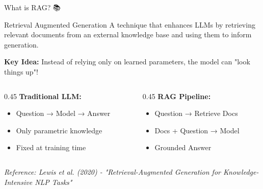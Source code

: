 \documentclass[aspectratio=169]{beamer}
\begin{document}
\begin{frame}[shrink=10]{What is RAG? 📚}
\begin{block}{Retrieval Augmented Generation}
A technique that enhances LLMs by retrieving relevant documents from an external knowledge base and using them to inform generation.
\end{block}

\vspace{1em}

\textbf{Key Idea:} Instead of relying only on learned parameters, the model can "look things up"!

\vspace{1em}

\begin{columns}[T]
\begin{column}{0.45\textwidth}
\textbf{Traditional LLM:}
\begin{itemize}\setlength{\itemsep}{0pt}
    \item Question → Model → Answer
    \item Only parametric knowledge
    \item Fixed at training time
\end{itemize}
\end{column}

\begin{column}{0.45\textwidth}
\textbf{RAG Pipeline:}
\begin{itemize}\setlength{\itemsep}{0pt}
    \item Question → Retrieve Docs
    \item Docs + Question → Model
    \item Grounded Answer
\end{itemize}
\end{column}
\end{columns}

\vspace{1em}
\small
\textit{Reference: Lewis et al. (2020) - "Retrieval-Augmented Generation for Knowledge-Intensive NLP Tasks"}
\end{frame}
\end{document}
